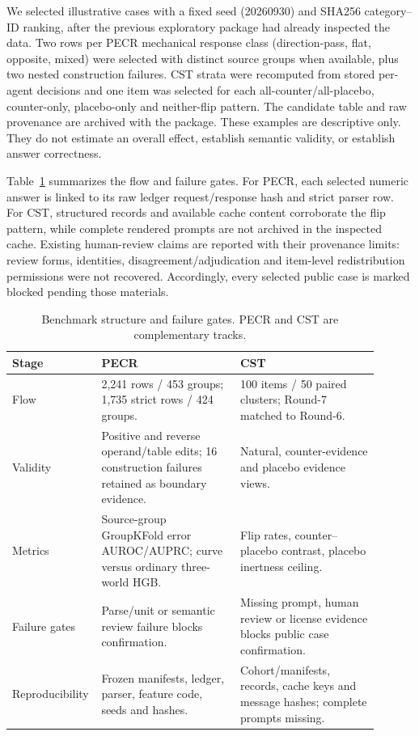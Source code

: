 \documentclass[11pt]{article}
\begin{document}
We selected illustrative cases with a fixed seed (20260930) and SHA256 category--ID ranking, after the previous exploratory package had already inspected the data. Two rows per PECR mechanical response class (direction-pass, flat, opposite, mixed) were selected with distinct source groups when available, plus two nested construction failures. CST strata were recomputed from stored per-agent decisions and one item was selected for each all-counter/all-placebo, counter-only, placebo-only and neither-flip pattern. The candidate table and raw provenance are archived with the package. These examples are descriptive only. They do not estimate an overall effect, establish semantic validity, or establish answer correctness.

Table~\ref{tab:benchmark-structure} summarizes the flow and failure gates. For PECR, each selected numeric answer is linked to its raw ledger request/response hash and strict parser row. For CST, structured records and available cache content corroborate the flip pattern, while complete rendered prompts are not archived in the inspected cache. Existing human-review claims are reported with their provenance limits: review forms, identities, disagreement/adjudication and item-level redistribution permissions were not recovered. Accordingly, every selected public case is marked blocked pending those materials.

\begin{table}[t]
\centering\small
\caption{Benchmark structure and failure gates. PECR and CST are complementary tracks.}
\label{tab:benchmark-structure}
\begin{tabular}{p{0.16\linewidth}p{0.37\linewidth}p{0.37\linewidth}}
\toprule
Stage & PECR & CST\\
\midrule
Flow & 2,241 rows / 453 groups; 1,735 strict rows / 424 groups. & 100 items / 50 paired clusters; Round-7 matched to Round-6.\\
Validity & Positive and reverse operand/table edits; 16 construction failures retained as boundary evidence. & Natural, counter-evidence and placebo evidence views.\\
Metrics & Source-group GroupKFold error AUROC/AUPRC; curve versus ordinary three-world HGB. & Flip rates, counter--placebo contrast, placebo inertness ceiling.\\
Failure gates & Parse/unit or semantic review failure blocks confirmation. & Missing prompt, human review or license evidence blocks public case confirmation.\\
Reproducibility & Frozen manifests, ledger, parser, feature code, seeds and hashes. & Cohort/manifests, records, cache keys and message hashes; complete prompts missing.\\
\bottomrule
\end{tabular}
\end{table}
\end{document}
